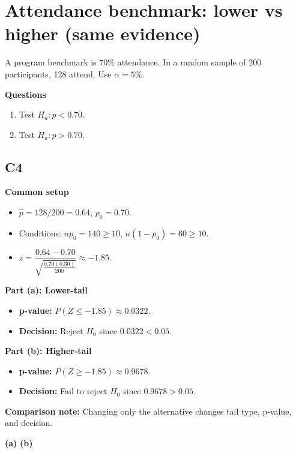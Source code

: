 \begin{center}
\hspace{0.8cm}
\end{center}


\section{Attendance benchmark: lower vs higher (same evidence)}
A program benchmark is 70\% attendance. In a random sample of 200 participants, 128 attend. Use \(\alpha=5\%\).

\textbf{Questions}
\begin{enumerate}
    \item[(a)] Test \(H_a\colon p<0.70\).
    \item[(b)] Test \(H_a\colon p>0.70\).
\end{enumerate}

\subsection*{C4}
\textbf{Common setup}
\begin{itemize}
    \item \(\hat p=128/200=0.64\), \(p_0=0.70\).
    \item Conditions: \(np_0=140\ge10\), \(n(1-p_0)=60\ge10\).
    \item \(z=\dfrac{0.64-0.70}{\sqrt{\frac{0.70(0.30)}{200}}}\approx -1.85\).
\end{itemize}

\textbf{Part (a): Lower-tail}
\begin{itemize}
    \item \textbf{p-value:} \(P(Z\le -1.85)\approx 0.0322\).
    \item \textbf{Decision:} Reject \(H_0\) since \(0.0322<0.05\).
\end{itemize}

\textbf{Part (b): Higher-tail}
\begin{itemize}
    \item \textbf{p-value:} \(P(Z\ge -1.85)\approx 0.9678\).
    \item \textbf{Decision:} Fail to reject \(H_0\) since \(0.9678>0.05\).
\end{itemize}

\textbf{Comparison note:} Changing only the alternative changes tail type, p-value, and decision.

\begin{center}
\textbf{(a)}\;
\hspace{0.8cm}
\textbf{(b)}\;
\end{center}



